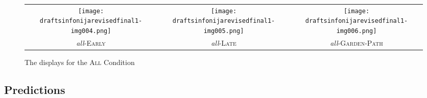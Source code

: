 \documentclass[output=paper]{langscibook}
\begin{document}



\begin{figure}[h] 
\begin{tabularx}{\textwidth}{CCC}
\texttt{[image: draftsinfonijarevisedfinal1-img004.png]}&\texttt{[image: draftsinfonijarevisedfinal1-img005.png]}&\texttt{[image: draftsinfonijarevisedfinal1-img006.png]}\\
\textit{all}-\textsc{Early}&\textit{all}-\textsc{Late}&\textit{all}-\textsc{Garden-Path}\\
\end{tabularx}
\caption{The displays for the \textsc{All} Condition}
    \label{tom:fig:all}
\end{figure}



\subsection{Predictions} \label{tom:Predictions}
\end{document}
